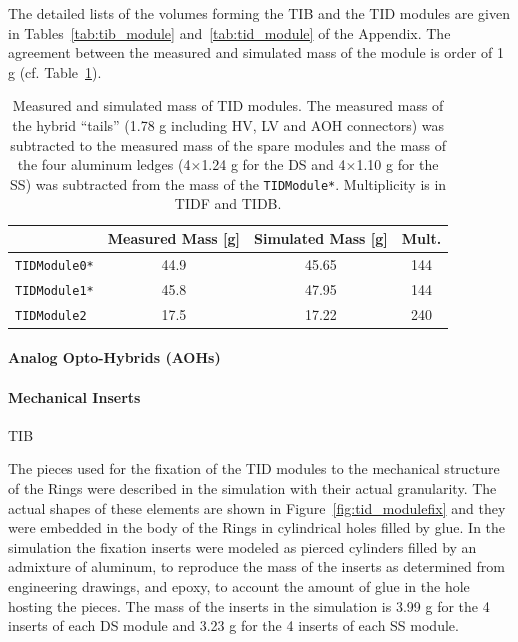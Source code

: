 \documentclass{cmspaper}
\begin{document}
The detailed lists of the volumes forming the TIB and the TID modules
are given in Tables~\ref{tab:tib_module} and~\ref{tab:tid_module} of
the Appendix.%
The agreement between the measured and simulated mass of the module is
order of 1 g (cf. Table~\ref{tab:tibtid_module_mass}).   
\begin{table}[h!]
  \caption{Measured and simulated mass of TID modules. The measured mass of the
  hybrid ``tails'' (1.78 g including HV, LV and AOH connectors) was
  subtracted to the measured mass of the spare modules and
  the mass of the four aluminum ledges (4$\times$1.24 g for the DS and 4$\times$1.10
  g for the SS) was subtracted from the mass of the {\tt TIDModule*}.
  Multiplicity is in TIDF and TIDB.}
  \label{tab:tibtid_module_mass}
  \begin{center}
    \begin{tabular}{lccc}
      & Measured Mass [g] & Simulated Mass [g] & Mult.\\
      \hline
      {\tt TIDModule0*} & 44.9 & 45.65 & 144 \\
      {\tt TIDModule1*} & 45.8 & 47.95 & 144 \\
      {\tt TIDModule2}  & 17.5 & 17.22 & 240 \\
      \hline
    \end{tabular}
  \end{center}
\end{table}

\paragraph{Analog Opto-Hybrids (AOHs)}


\paragraph{Mechanical Inserts}

\fixme TIB

The pieces used for the fixation of the TID modules to the mechanical structure
of the Rings were described in the simulation with their actual
granularity. The actual shapes of these elements are shown in
Figure~\ref{fig:tid_modulefix} and they were embedded in the body
of the Rings in cylindrical holes filled by glue. In the simulation
the fixation inserts were modeled as pierced cylinders filled by an
admixture of aluminum, to reproduce the mass of the inserts as
determined from engineering drawings, and epoxy, to account the amount
of glue in the hole hosting the pieces. The mass of the inserts in the
simulation is 3.99 g for the 4 inserts of each DS module and  3.23 g
for the 4 inserts of each SS module.  
\end{document}
